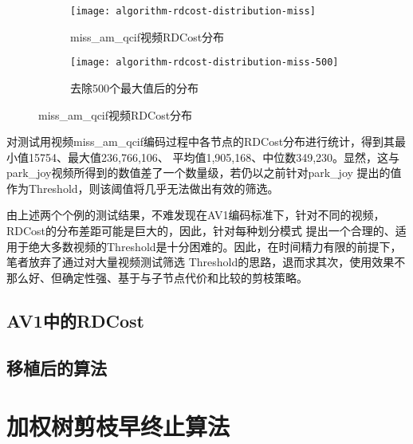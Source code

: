 \begin{figure}[H]
  \centering%
  \begin{subfigure}{0.43\textwidth}
    \centering
    \texttt{[image: algorithm-rdcost-distribution-miss]}
    \caption{miss\_am\_qcif视频RDCost分布}
  \end{subfigure}%
  \hspace{2em}%
  \begin{subfigure}{0.43\textwidth}
    \centering
    \texttt{[image: algorithm-rdcost-distribution-miss-500]}
    \caption{去除500个最大值后的分布}
  \end{subfigure}
  \caption{miss\_am\_qcif视频RDCost分布}
  \label{fig:algorithm-rdcost-distribution-miss}
\end{figure}

对测试用视频miss\_am\_qcif编码过程中各节点的RDCost分布进行统计，得到其最小值15754、最大值236,766,106、
平均值1,905,168、中位数349,230。显然，这与park\_joy视频所得到的数值差了一个数量级，若仍以之前针对park\_joy
提出的值作为Threshold，则该阈值将几乎无法做出有效的筛选。

由上述两个个例的测试结果，不难发现在AV1编码标准下，针对不同的视频，RDCost的分布差距可能是巨大的，因此，针对每种划分模式
提出一个合理的、适用于绝大多数视频的Threshold是十分困难的。因此，在时间精力有限的前提下，笔者放弃了通过对大量视频测试筛选
Threshold的思路，退而求其次，使用效果不那么好、但确定性强、基于与子节点代价和比较的剪枝策略。

\subsection{AV1中的RDCost}

\subsection{移植后的算法}

\section{加权树剪枝早终止算法}